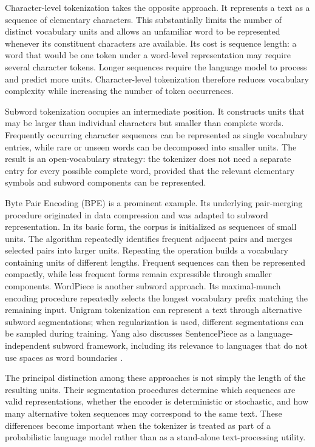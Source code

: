 Character-level tokenization takes the opposite approach. It represents a text as a sequence of elementary characters. This substantially limits the number of distinct vocabulary units and allows an unfamiliar word to be represented whenever its constituent characters are available. Its cost is sequence length: a word that would be one token under a word-level representation may require several character tokens. Longer sequences require the language model to process and predict more units. Character-level tokenization therefore reduces vocabulary complexity while increasing the number of token occurrences.

Subword tokenization occupies an intermediate position. It constructs units that may be larger than individual characters but smaller than complete words. Frequently occurring character sequences can be represented as single vocabulary entries, while rare or unseen words can be decomposed into smaller units. The result is an open-vocabulary strategy: the tokenizer does not need a separate entry for every possible complete word, provided that the relevant elementary symbols and subword components can be represented.

Byte Pair Encoding (BPE) is a prominent example. Its underlying pair-merging procedure originated in data compression and was adapted to subword representation. In its basic form, the corpus is initialized as sequences of small units. The algorithm repeatedly identifies frequent adjacent pairs and merges selected pairs into larger units. Repeating the operation builds a vocabulary containing units of different lengths. Frequent sequences can then be represented compactly, while less frequent forms remain expressible through smaller components. WordPiece is another subword approach. Its maximal-munch encoding procedure repeatedly selects the longest vocabulary prefix matching the remaining input. Unigram tokenization can represent a text through alternative subword segmentations; when regularization is used, different segmentations can be sampled during training. Yang also discusses SentencePiece as a language-independent subword framework, including its relevance to languages that do not use spaces as word boundaries \parencite{yang2024rethinking,gastaldi2025foundations}.

The principal distinction among these approaches is not simply the length of the resulting units. Their segmentation procedures determine which sequences are valid representations, whether the encoder is deterministic or stochastic, and how many alternative token sequences may correspond to the same text. These differences become important when the tokenizer is treated as part of a probabilistic language model rather than as a stand-alone text-processing utility.

